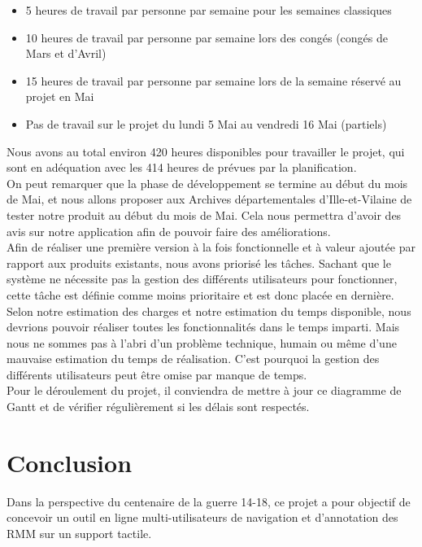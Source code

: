\documentclass[a4paper]{article}
\begin{document}
\begin{itemize}
\item 5 heures de travail par personne par semaine pour les semaines classiques
\item 10 heures de travail par personne par semaine lors des congés (congés de Mars et d'Avril)
\item 15 heures de travail par personne par semaine lors de la semaine réservé au projet en Mai
\item Pas de travail sur le projet du lundi 5 Mai au vendredi 16 Mai (partiels)
\end{itemize}

	Nous avons au total environ 420 heures disponibles pour travailler le projet, qui sont en adéquation avec les 414 heures de prévues par la planification.\\

	On peut remarquer que la phase de développement se termine au début du mois de Mai, et nous allons proposer aux Archives départementales d’Ille-et-Vilaine de tester notre produit au début du mois de Mai. Cela nous permettra d'avoir des avis sur notre application afin de pouvoir faire des améliorations.\\

	Afin de réaliser une première version à la fois fonctionnelle et à valeur ajoutée par rapport aux produits existants, nous avons priorisé les tâches. Sachant que le système ne nécessite pas la gestion des différents utilisateurs pour fonctionner, cette tâche est définie comme moins prioritaire et est donc placée en dernière. Selon notre estimation des charges et notre estimation du temps disponible, nous devrions pouvoir réaliser toutes les fonctionnalités dans le temps imparti. Mais nous ne sommes pas à l'abri d'un problème technique, humain ou même d'une mauvaise estimation du temps de réalisation. C'est pourquoi la gestion des différents utilisateurs peut être omise par manque de temps.\\
	
	Pour le déroulement du projet, il conviendra de mettre à jour ce diagramme de Gantt et de vérifier régulièrement si les délais sont respectés.

\newpage
{}
{}
\section*{Conclusion}

	Dans la perspective du centenaire de la guerre 14-18, ce projet a pour objectif de concevoir un outil en ligne multi-utilisateurs de navigation et d’annotation des RMM sur un support tactile.\\
	
\end{document}
